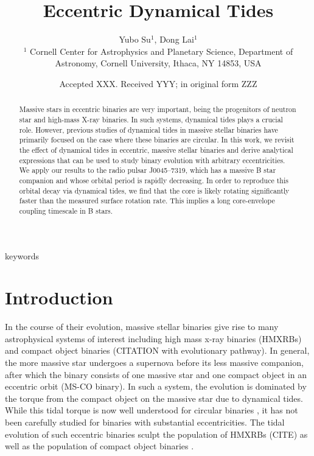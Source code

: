 \documentclass[
        fleqn,
        usenatbib,
    ]{mnras}
\title[Eccentric Dynamical Tides]{Eccentric Dynamical Tides}
\author[Y. Su, D. Lai.]{
Yubo Su$^1$,
Dong Lai$^1$
\\
$^1$ Cornell Center for Astrophysics and Planetary Science, Department of
Astronomy, Cornell University, Ithaca, NY 14853, USA
}
\date{Accepted XXX\@. Received YYY\@; in original form ZZZ}
\begin{document}
\label{firstpage}
\pagerange{\pageref{firstpage}--\pageref{lastpage}}
\maketitle

\begin{abstract}
    Massive stars in eccentric binaries are very important, being the progenitors
    of neutron star and high-mass X-ray binaries. In such systems, dynamical
    tides plays a crucial role. However, previous studies of dynamical tides in
    massive stellar binaries have primarily focused on the case where these
    binaries are circular. In this work, we revisit the effect of dynamical
    tides in eccentric, massive stellar binaries and derive analytical
    expressions that can be used to study binary evolution with arbitrary
    eccentricities. We apply our results to the radio pulsar J0045--7319, which
    has a massive B star companion and whose orbital period is rapidly
    decreasing. In order to reproduce this orbital decay via dynamical tides, we
    find that the core is likely rotating significantly faster than the measured
    surface rotation rate. This implies a long core-envelope coupling timescale
    in B stars.
\end{abstract}

\begin{keywords}
keywords
\end{keywords}

\section{Introduction}

In the course of their evolution, massive stellar binaries give rise to many
astrophysical systems of interest including high mass x-ray binaries (HMXRBs)
and compact object binaries (CITATION with evolutionary pathway). In general,
the more massive star undergoes a supernova before its less massive companion,
after which the binary consists of one massive star and one compact object in an
eccentric orbit (MS-CO binary). In such a system, the evolution is dominated by
the torque from the compact object on the massive star due to dynamical tides.
While this tidal torque is now well understood for circular binaries
\citep{kushnir}, it has not been carefully studied for binaries with substantial
eccentricities. The tidal evolution of such eccentric binaries sculpt the
population of HMXRBs (CITE) as well as the population of compact object binaries
\citep{vigna2020common}.
\end{document}
